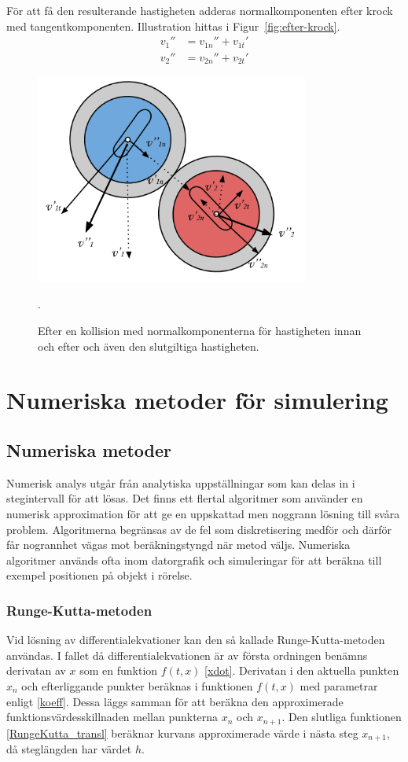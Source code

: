 \documentclass[11pt]{article} %
\begin{document}
\pagebreak

För att få den resulterande hastigheten adderas normalkomponenten efter krock med tangentkomponenten. Illustration hittas i Figur~\ref{fig:efter-krock}. 
 \begin{align}\label{vfinal}
v_1''& = v_{1n}'' + v_{1t}'\\
v_2''& = v_{2n}'' + v_{2t}'
 \end{align}

\begin{figure}[ht!]
\centering
\includegraphics[width=90mm]{efter-krock.png}
\caption{Efter en kollision med normalkomponenterna för hastigheten innan och efter och även den slutgiltiga hastigheten.  }.
\label{fig:efter-krock}
\label{overflow}
\end{figure}

\pagebreak
\section{Numeriska metoder för simulering}

\subsection{Numeriska metoder}
Numerisk analys utgår från analytiska uppställningar som kan delas in i stegintervall för
att lösas. Det finns ett flertal algoritmer som använder en numerisk approximation för
att ge en uppskattad men noggrann lösning till svåra problem. Algoritmerna begränsas
av de fel som diskretisering medför och därför får nogrannhet vägas mot beräkningstyngd
när metod väljs. Numeriska algoritmer används ofta inom datorgrafik och simuleringar
för att beräkna till exempel positionen på objekt i rörelse.

\subsubsection{Runge-Kutta-metoden}
Vid lösning av differentialekvationer kan den så kallade Runge-Kutta-metoden användas.
I fallet då differentialekvationen är av första ordningen benämns derivatan av $x$ som en
funktion $f(t, x)$ \eqref{xdot}. Derivatan i den aktuella punkten $x_n$ och efterliggande punkter
beräknas i funktionen $f(t, x)$ med parametrar enligt \eqref{koeff}. Dessa läggs samman för att
beräkna den approximerade funktionsvärdesskillnaden mellan punkterna $x_n$ och $x_{n+1}$.
Den slutliga funktionen \eqref{RungeKutta_transl} beräknar kurvans approximerade värde i nästa steg $x_{n+1}$,
då steglängden har värdet $h$.
\end{document}
